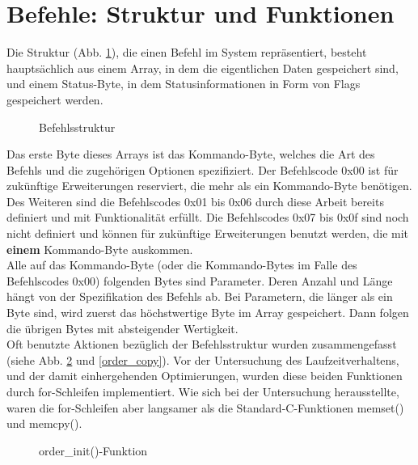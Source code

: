 \section{Befehle: Struktur und Funktionen}
Die Struktur (Abb. \ref{order_type}), die einen Befehl im System repräsentiert, besteht hauptsächlich aus einem Array, in dem die eigentlichen Daten
gespeichert sind, und einem Status-Byte, in dem Statusinformationen in Form von Flags gespeichert werden.
\begin{figure}[htb]
 \centering
 \caption{\label{order_type}Befehlsstruktur}
\end{figure}
Das erste Byte dieses Arrays ist das Kommando-Byte, welches die Art des Befehls und die zugehörigen Optionen spezifiziert. Der
Befehlscode 0x00 ist für zukünftige Erweiterungen reserviert, die mehr als ein Kommando-Byte
benötigen. Des Weiteren sind die Befehlscodes 0x01 bis 0x06 durch diese Arbeit bereits definiert und mit Funktionalität erfüllt.
Die Befehlscodes 0x07 bis 0x0f sind noch nicht definiert und können für zukünftige Erweiterungen benutzt werden, die mit \textbf{einem}
Kommando-Byte auskommen.\\
Alle auf das Kommando-Byte (oder die Kommando-Bytes im Falle des Befehlscodes 0x00) folgenden Bytes sind Parameter. Deren Anzahl und Länge
hängt von der Spezifikation des Befehls ab.
Bei Parametern, die länger als ein Byte sind, wird zuerst das höchstwertige Byte im Array gespeichert. 
Dann folgen die übrigen Bytes mit absteigender Wertigkeit.\\
Oft benutzte Aktionen bezüglich der Befehlsstruktur wurden zusammengefasst (siehe Abb. \ref{order_init} und \ref{order_copy}).
Vor der Untersuchung des Laufzeitverhaltens, und der damit einhergehenden Optimierungen, wurden diese beiden Funktionen
durch for-Schleifen implementiert. Wie sich bei der Untersuchung herausstellte, waren die for-Schleifen aber langsamer
als die Standard-C-Funktionen memset() und memcpy().
\begin{figure}[htb]
 \centering
 \caption{\label{order_init}order\_init()-Funktion}
\end{figure}
